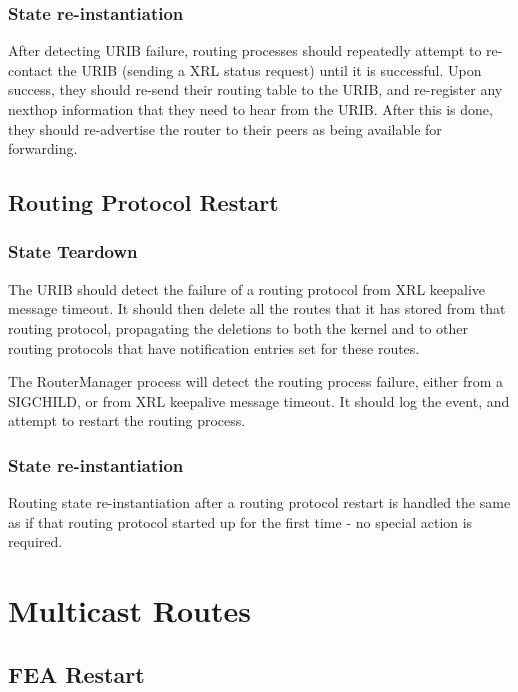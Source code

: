 \documentclass[11pt]{article}
\begin{document}
\subsubsection*{State re-instantiation}

After detecting URIB failure, routing processes should repeatedly
attempt to re-contact the URIB (sending a XRL status request) until it
is successful.  Upon success, they should re-send their routing table
to the URIB, and re-register any nexthop information that they need to
hear from the URIB.  After this is done, they should re-advertise the
router to their peers as being available for forwarding.

\subsection{Routing Protocol Restart}

\subsubsection*{State Teardown}

The URIB should detect the failure of a routing protocol from XRL
keepalive message timeout.  It should then delete all the routes that
it has stored from that routing protocol, propagating the deletions to
both the kernel and to other routing protocols that have notification
entries set for these routes.

The RouterManager process will detect the routing process failure,
either from a SIGCHILD, or from XRL keepalive message timeout.  It
should log the event, and attempt to restart the routing process.

\subsubsection*{State re-instantiation}

Routing state re-instantiation after a routing protocol restart is
handled the same as if that routing protocol started up for the first
time - no special action is required.

\section{Multicast Routes}

\subsection{FEA Restart}
\end{document}
